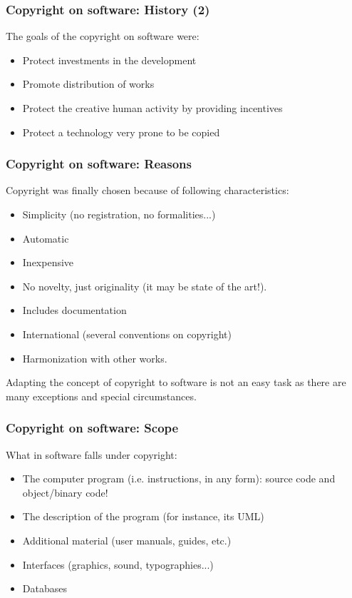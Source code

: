 
\begin{frame}
\frametitle{Copyright on software: History (2)}

The goals of the copyright on software were:

\begin{itemize}
\item Protect investments in the development
\item Promote distribution of works
\item Protect the creative human activity by providing incentives
\item Protect a technology very prone to be copied
\end{itemize}

\end{frame}



\begin{frame}
\frametitle{Copyright on software: Reasons}

Copyright was finally chosen because of following characteristics:

\begin{itemize}
\item Simplicity (no registration, no formalities...)
\item Automatic
\item Inexpensive
\item No novelty, just originality (it may be state of the art!). 
\item Includes documentation
\item International (several conventions on copyright)
\item Harmonization with other works.
\end{itemize}

Adapting the concept of copyright to software is not an easy task as
there are many exceptions and special circumstances.

\end{frame}



\begin{frame}
\frametitle{Copyright on software: Scope}

What in software falls under copyright:

\begin{itemize}
\item The computer program (i.e. instructions, in any form): 
      source code and object/binary code!
\item The description of the program (for instance, its UML)
\item Additional material (user manuals, guides, etc.)
\item Interfaces (graphics, sound, typographies...)
\item Databases
\end{itemize}

\end{frame}

